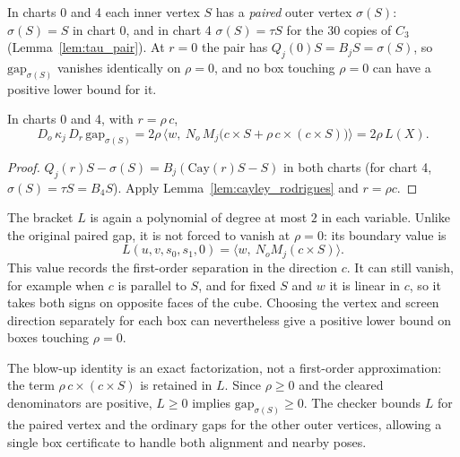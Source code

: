 In charts 0 and 4 each inner vertex $S$ has a \emph{paired} outer vertex
$\sigma(S)$: $\sigma(S) = S$ in chart 0, and in chart 4 $\sigma(S) = \tau S$ for the 30
copies of $C_3$ (Lemma~\ref{lem:tau_pair}). At $r = 0$ the pair has
$Q_j(0) S = B_j S = \sigma(S)$, so $\mathrm{gap}_{\sigma(S)}$ vanishes identically on
$\rho = 0$, and no box touching $\rho = 0$ can have a positive lower bound for it.

\begin{lemma}
\label{lem:blowup_identity}
\leanok
{}
In charts 0 and 4, with $r = \rho\, c$,
\[
  D_o\, \kappa_j\, D_r\, \mathrm{gap}_{\sigma(S)}
  = 2 \rho\, \bigl\langle w,\ N_o\, M_j \bigl(c \times S + \rho\, c \times (c \times S)\bigr) \bigr\rangle
  = 2\rho\, L(X).
\]
\end{lemma}
\begin{proof}
\leanok
$Q_j(r) S - \sigma(S) = B_j(\mathrm{Cay}(r) S - S)$ in both charts (for chart 4,
$\sigma(S) = \tau S = B_4 S$). Apply Lemma~\ref{lem:cayley_rodrigues} and
$r = \rho c$.
\end{proof}

The bracket $L$ is again a polynomial of degree at most $2$ in each variable. Unlike
the original paired gap, it is not forced to vanish at $\rho=0$: its boundary value is
\[
  L(u,v,s_0,s_1,0)=\bigl\langle w,\ N_o M_j(c\times S)\bigr\rangle.
\]
This value records the first-order separation in the direction $c$. It can still
vanish, for example when $c$ is parallel to $S$, and for fixed $S$ and $w$ it is linear
in $c$, so it takes both signs on opposite faces of the cube. Choosing the vertex and
screen direction separately for each box can nevertheless give a positive lower bound
on boxes touching $\rho=0$.

The blow-up identity is an exact factorization, not a first-order approximation:
the term $\rho\,c\times(c\times S)$ is retained in $L$. Since $\rho\ge0$ and the
cleared denominators are positive, $L\ge0$ implies
$\mathrm{gap}_{\sigma(S)}\ge0$. The checker bounds $L$ for the
paired vertex and the ordinary gaps for the other outer vertices, allowing a single
box certificate to handle both alignment and nearby poses.

